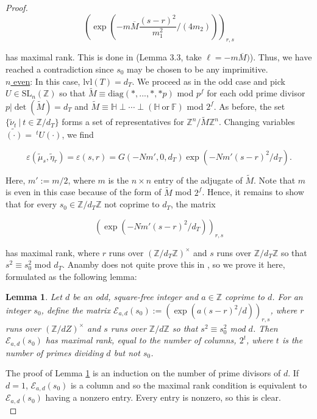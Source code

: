 \documentclass[11pt]{article}
\newtheorem{lemma}[theorem]{Lemma}
\theoremstyle{definition}
\theoremstyle{remark}
\newcommand{\Z}{\mathbb{Z}}
\newcommand{\h}{\mathbb{H}}
\newcommand{\SL}{\text{SL}}
\begin{document}
\begin{proof}
\[
\left(\exp \left({-m \overline{M} \frac{(s-r)^2}{m_1^2}}/(4m_2)\right)\right)_{r,s}
\]

has maximal rank. This is done in \cite{anamby} (Lemma 3.3, take $\ell = -m \overline{M})$). Thus, we have reached a contradiction since $s_0$ may be chosen to be any imprimitive. \\

\underline{$n$ even}: In this case, $\mathrm{lvl}(T) = d_T$. We proceed as in the odd case and pick $U \in \SL_n(\Z)$ so that $\widetilde{M} \equiv \text{diag}(\ast,...,\ast, \ast p)$ mod $p^f$ for each odd prime divisor $p \vert \det(\widetilde{M}) = d_T$ and $\widetilde{M} \equiv \h \perp \cdots \perp (\h \ \text{or} \ \mathbb{F})$ mod $2^f$. As before, the set $\{\tilde{\nu}_t \ \vert \ t \in \Z/d_T\}$ forms a set of representatives for $\Z^n/\widetilde{M}\Z^n$. Changing variables $\widetilde{( \cdot )} = \ ^tU ( \cdot )$, we find 

\[
\varepsilon(\tilde{\mu}_s, \tilde{\eta}_r) = \varepsilon(s,r) = G(-Nm', 0, d_T) \exp(-Nm'(s-r)^2/d_T).
\]

Here, $m' := m/2$, where $m$ is the $n \times n$ entry of the adjugate of $\widetilde{M}$. Note that $m$ is even in this case because of the form of $\widetilde{M}$ mod $2^f$. Hence, it remains to show that for every $s_0 \in \Z/d_T\Z$ not coprime to $d_T$, the matrix 

\[
\left( \exp(-Nm'(s-r)^2/d_T )\right)_{r,s}
\]

has maximal rank, where $r$ runs over $(\Z/d_T\Z)^{\times}$ and $s$ runs over $\Z/d_T\Z$ so that $s^2 \equiv s_0^2$ mod $d_T$. Anamby does not quite prove this in \cite{anamby}, so we prove it here, formulated as the following lemma: \\

\begin{lemma} \label{rank lemma}
    Let $d$ be an odd, square-free integer and $a \in \Z$ coprime to $d$. For an integer $s_0$, define the matrix $\mathcal{E}_{a,d}(s_0) := \left( \exp(a(s-r)^2/d)\right)_{r,s}$, where $r$ runs over $(\Z/dZ)^\times$ and $s$ runs over $\Z/d\Z$ so that $s^2 \equiv s_0^2$ mod $d$. Then $\mathcal{E}_{a,d}(s_0)$ has maximal rank, equal to the number of columns, $2^t$, where $t$ is the number of primes dividing $d$ but not $s_0$.  
\end{lemma}

The proof of Lemma \ref{rank lemma} is an induction on the number of prime divisors of $d$. If $d = 1$, $\mathcal{E}_{a,d}(s_0)$ is a column and so the maximal rank condition is equivalent to $\mathcal{E}_{a,d}(s_0)$ having a nonzero entry. Every entry is nonzero, so this is clear. \\


\end{proof}
\end{document}
